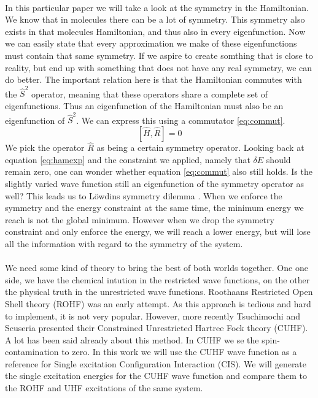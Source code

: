 \documentclass[twoside,twocolumn,9pt]{article}
\begin{document}
\paragraph*{}
In this particular paper we will take a look at the symmetry in the Hamiltonian. We know that in molecules there can be a lot of symmetry. This symmetry also exists in that
molecules Hamiltonian, and thus also in every eigenfunction. Now we can easily state that every approximation we make of these eigenfunctions must contain that same symmetry.
If we aspire to create somthing that is close to reality, but end up with something that does not have any real symmetry, we can do better. The important relation here is that
the Hamiltonian commutes with the $\hat{S}^2$ operator, meaning that these operators share a complete set of eigenfunctions. Thus an eigenfunction of the Hamiltonian must also
be an eigenfunction of $\hat{S}^2$. We can express this using a commutator \eqref{eq:commut}.
\begin{equation}\label{eq:commut}
  [\hat{H}, \hat{R}] = 0
\end{equation}
We pick the operator $\hat{R}$ as being a certain symmetry operator. Looking back at equation \eqref{eq:hamexp} and the constraint we applied, namely that $\delta E$ should
remain zero, one can wonder whether equation \eqref{eq:commut} also still holds. Is the slightly varied wave function still an eigenfunction of the symmetry operator as well?
This leads us to Löwdins symmetry dilemma \cite{Lowdin1963}. When we enforce the symmetry and the energy constraint at the same time, the minimum energy we reach is not the
global minimum. However when we drop the symmetry constraint and only enforce the energy, we will reach a lower energy, but will lose all the information with regard to the
symmetry of the system.
\paragraph*{}
We need some kind of theory to bring the best of both worlds together. One one side, we have the chemical intution in the restricted wave functions, on the other the physical
truth in the unrestricted wave functions. Roothaans Restricted Open Shell theory (ROHF)\cite{Roothaan1960} was an early attempt. As this approach is tedious and hard to implement, it 
is not very popular. However, more recently Tsuchimochi and Scuseria presented their Constrained Unrestricted Hartree Fock theory (CUHF)\cite{Scuseria2010}. A lot has been said 
already about this method\cite{Plakhutin2014, Scuseria2011}. In CUHF we se the spin-contamination to zero. In this work we will use the CUHF wave function as a reference for 
Single excitation Configuration Interaction (CIS). We will generate the single excitation energies for the CUHF wave function and compare them to the ROHF and UHF excitations of 
the same system.
\end{document}
